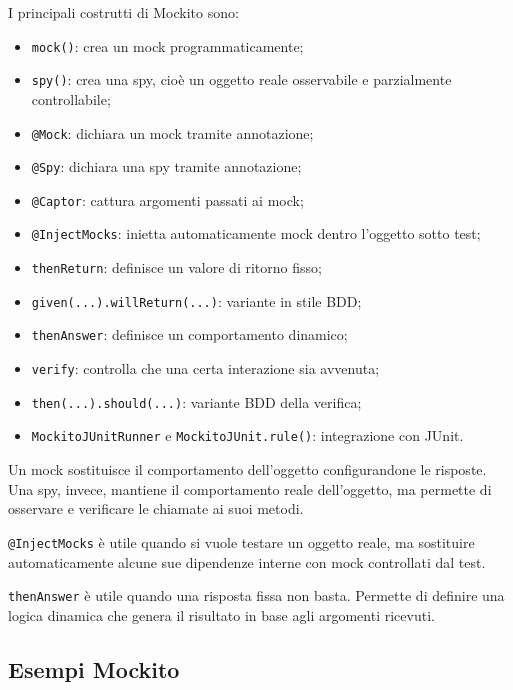 I principali costrutti di Mockito sono:

\begin{itemize}
    \item \texttt{mock()}: crea un mock programmaticamente;
    \item \texttt{spy()}: crea una spy, cioè un oggetto reale osservabile e parzialmente controllabile;
    \item \texttt{@Mock}: dichiara un mock tramite annotazione;
    \item \texttt{@Spy}: dichiara una spy tramite annotazione;
    \item \texttt{@Captor}: cattura argomenti passati ai mock;
    \item \texttt{@InjectMocks}: inietta automaticamente mock dentro l'oggetto sotto test;
    \item \texttt{thenReturn}: definisce un valore di ritorno fisso;
    \item \texttt{given(...).willReturn(...)}: variante in stile BDD;
    \item \texttt{thenAnswer}: definisce un comportamento dinamico;
    \item \texttt{verify}: controlla che una certa interazione sia avvenuta;
    \item \texttt{then(...).should(...)}: variante BDD della verifica;
    \item \texttt{MockitoJUnitRunner} e \texttt{MockitoJUnit.rule()}: integrazione con JUnit.
\end{itemize}

\begin{notaprof}
Un mock sostituisce il comportamento dell'oggetto configurandone le risposte. Una spy, invece, mantiene il comportamento reale dell'oggetto, ma permette di osservare e verificare le chiamate ai suoi metodi.
\end{notaprof}

\begin{notaprof}
\texttt{@InjectMocks} è utile quando si vuole testare un oggetto reale, ma sostituire automaticamente alcune sue dipendenze interne con mock controllati dal test.
\end{notaprof}

\begin{notaprof}
\texttt{thenAnswer} è utile quando una risposta fissa non basta. Permette di definire una logica dinamica che genera il risultato in base agli argomenti ricevuti.
\end{notaprof}

\subsection{Esempi Mockito}

